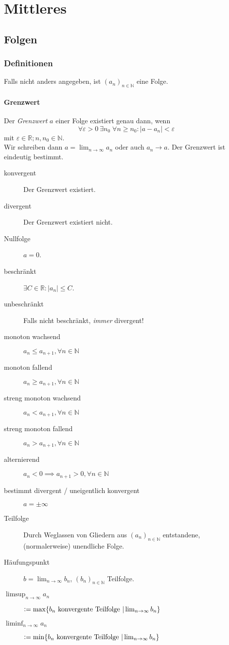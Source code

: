 \documentclass[a4paper, 9pt, DIV=24]{scrartcl}
\newcommand{\N}{\mathbb{N}}
\newcommand{\R}{\mathbb{R}}
\newcommand{\defeq}{\vcentcolon=}
\begin{document}
\clearpage
\section{Mittleres}

\subsection{Folgen}
\subsubsection{Definitionen}
Falls nicht anders angegeben, ist $(a_n)_{n\in\N}$ eine Folge.
\paragraph{Grenzwert}Der \emph{Grenzwert} $a$ einer Folge existiert genau dann,
wenn 
\[ \forall \varepsilon > 0 \: \exists n_0 \; \forall n \geq n_0: |a - a_n| < \varepsilon \]
mit $ \varepsilon \in \R; n,n_0 \in\N  $. \\
Wir schreiben dann $a = \lim_{n\to\infty} a_n$ oder auch $a_n \to a$. Der Grenzwert ist eindeutig bestimmt.
\begin{description}
 \item[konvergent] Der Grenzwert existiert.
 \item[divergent] Der Grenzwert existiert nicht.
 \item[Nullfolge] $a = 0$.
 \item[beschränkt] $\exists C\in\R: |a_n| \leq C$.
 \item[unbeschränkt] Falls nicht beschränkt, \emph{immer} divergent!
 \item[monoton wachsend] $a_n \leq a_{n+1}, \forall{n\in\N}$
 \item[monoton fallend] $a_n \geq a_{n+1}, \forall{n\in\N}$
 \item[streng monoton wachsend] $a_n < a_{n+1}, \forall{n\in\N}$
 \item[streng monoton fallend] $a_n > a_{n+1}, \forall{n\in\N}$
 \item[alternierend] $a_n < 0 \implies a_{n+1} > 0, \forall{n\in\N}$
 \item[bestimmt divergent / uneigentlich konvergent] $a = \pm \infty$
 \item[Teilfolge] Durch Weglassen von Gliedern aus $(a_n)_{n\in\N}$ entstandene, (normalerweise) unendliche Folge.
 \item[Häufungspunkt] $b = \lim_{n\to\infty} b_n$, $(b_n)_{n\in\N}$ Teilfolge.
 \item[$\limsup_{n\to\infty}a_n$]$\defeq\max\{b_n\text{ konvergente Teilfolge } | \lim_{n\to\infty} b_n\}$
 \item[$\liminf_{n\to\infty}a_n$]$\defeq\min\{b_n\text{ konvergente Teilfolge } | \lim_{n\to\infty} b_n\}$
\end{description}
\end{document}
